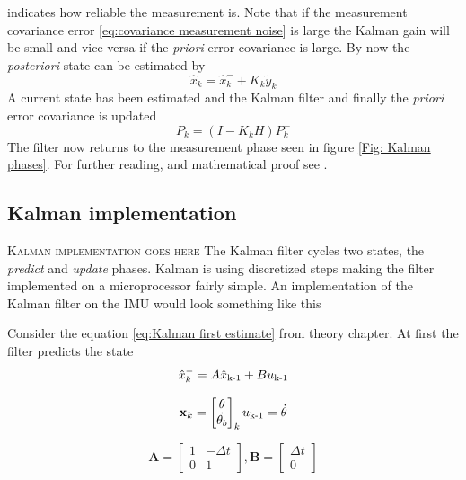 \documentclass[a4paper,11pt]{kth-mag}
\begin{document}
indicates how reliable the measurement is. Note that if the measurement covariance error \eqref{eq:covariance measurement noise} is large the Kalman gain will be small and vice versa if the \textit{priori} error covariance is large.
By now the \textit{posteriori} state can be estimated by
\begin{equation}
\hat{x}_k = \hat{x}^-_k + K_k\tilde{y}_k
\end{equation}
A current state has been estimated and the Kalman filter and finally the \textit{priori} error covariance is updated
\begin{equation}
P_k=(I-K_kH)P^-_k
\end{equation} 
The filter now returns to the measurement phase seen in figure \ref{Fig: Kalman phases}.
For further reading, and mathematical proof see \cite{Kalmanintro}.


\subsection{Kalman implementation}
\textsc{Kalman implementation goes here}
The Kalman filter cycles two states, the \textit{predict} and \textit{update} phases. Kalman is using discretized steps making the filter implemented on a microprocessor fairly simple. 
An implementation of the Kalman filter on the IMU would look something like this

Consider the equation \eqref{eq:Kalman first estimate} from theory chapter. At first the filter predicts the state
\begin{equation}
\hat{x}^-_k = A\hat{x}\textsubscript{k-1}+Bu\textsubscript{k-1}
\end{equation}


\begin{equation}
\textbf{x}_k = \begin{bmatrix}
\theta \\
\dot{\theta_b}
\end{bmatrix}_k
u\textsubscript{k-1} = \dot{\theta}
\end{equation}

\begin{equation}
\textbf{A} = \begin{bmatrix}
1  & -\Delta t \\
0   & 1
\end{bmatrix}
,
\textbf{B} = \begin{bmatrix}
\Delta t \\ 0
\end{bmatrix}
\end{equation}
\end{document}
